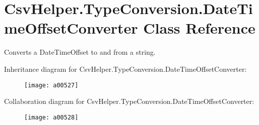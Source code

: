 \hypertarget{a00087}{\section{Csv\-Helper.\-Type\-Conversion.\-Date\-Time\-Offset\-Converter Class Reference}
\label{a00087}
}


Converts a Date\-Time\-Offset to and from a string.  




Inheritance diagram for Csv\-Helper.\-Type\-Conversion.\-Date\-Time\-Offset\-Converter\-:
\nopagebreak
\begin{figure}[H]
\begin{center}
\leavevmode
\texttt{[image: a00527]}
\end{center}
\end{figure}


Collaboration diagram for Csv\-Helper.\-Type\-Conversion.\-Date\-Time\-Offset\-Converter\-:
\nopagebreak
\begin{figure}[H]
\begin{center}
\leavevmode
\texttt{[image: a00528]}
\end{center}
\end{figure}
